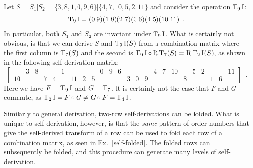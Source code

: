 \begin{example}
    \cite[218]{Starr1984}
    Let $S = S_1 | S_2 = \{ 3, 8, 1, 0, 9, 6 \} | \{ 4, 7, 10, 5, 2, 11 \}$ and consider the operation $\operatorname{T}_9\operatorname{I}$:
    \begin{equation}
        \operatorname{T}_9\operatorname{I} = (0 \; 9) (1 \; 8) (2 \; 7) (3 \; 6) (4 \; 5) (10 \; 11) \enspace.
    \end{equation}
    In particular, both $S_1$ and $S_2$ are invariant under $\operatorname{T}_9\operatorname{I}$. What is certainly not obvious, is that we can derive $S$ and $\operatorname{T}_9\operatorname{I}(S)$ from a combination matrix where the first column is $\operatorname{T}_7(S)$ and the second is $\operatorname{T}_9\operatorname{I} \circ \operatorname{R}\operatorname{T}_7(S) = \operatorname{R}\operatorname{T}_2\operatorname{I}(S)$, as shown in the following self-derivation matrix:
    \begin{equation}
        \left[
        \begin{array}{cccccccccccc|cccccccccccc}
            & 3 & 8 &&& 1 &&&& 0 & 9 & 6 &&&& 4 & 7 & 10 && 5 & 2 &&& 11 \\
            10 &&& 7 & 4 && 11 & 2 & 5 &&&& 3 & 0 & 9 &&&& 8 &&& 1 & 6 &
        \end{array}
        \right] \enspace.
    \end{equation}
    Here we have $F = \operatorname{T}_9\operatorname{I}$ and $G = \operatorname{T}_7$. It is certainly not the case that $F$ and $G$ commute, as $\operatorname{T}_2\operatorname{I} = F \circ G \ne G \circ F = \operatorname{T}_4\operatorname{I}$.
\end{example}

Similarly to general derivation, two-row self-derivations can be folded. What is unique to self-derivation, however, is that the \emph{same} pattern of order numbers that give the self-derived transform of a row can be used to fold each row of a combination matrix, as seen in Ex.~\ref{self-folded}. The folded rows can subsequently be folded, and this procedure can generate many levels of self-derivation.

